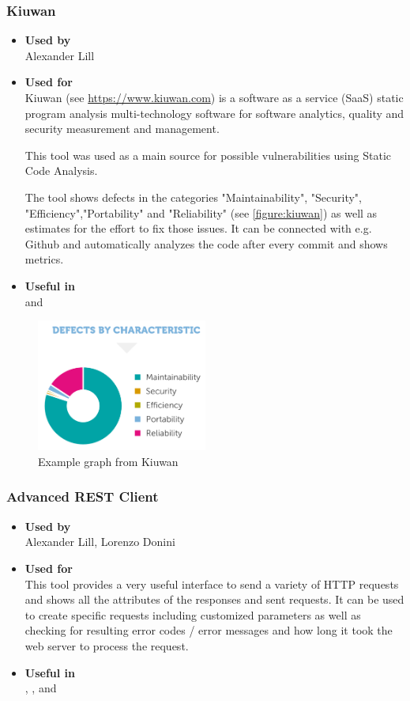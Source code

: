 \subsubsection*{Kiuwan}
\begin{itemize}
	\item \textbf{Used by}\\ Alexander Lill
	\item \textbf{Used for}\\
	Kiuwan (see \url{https://www.kiuwan.com}) is a software as a service (SaaS) static program analysis multi-technology software for software analytics, quality and security measurement and management.
	
	This tool was used as a main source for possible vulnerabilities using Static Code Analysis.
	
	The tool shows defects in the categories "Maintainability", "Security", "Efficiency","Portability" and "Reliability" (see \autoref{figure:kiuwan}) as well as estimates for the effort to fix those issues. It can be connected with e.g. Github and automatically analyzes the code after every commit and shows metrics.
	\item \textbf{Useful in}\\  and 
\end{itemize}

\begin{figure}[h!tbp]
	\centering
	\includegraphics[width=0.5\textwidth]{figures/kiuwanResults}
	\caption{Example graph from Kiuwan}
	\label{figure:kiuwan}
\end{figure}

\subsubsection*{Advanced REST Client}
\begin{itemize}
	\item \textbf{Used by}\\ Alexander Lill, Lorenzo Donini
	\item \textbf{Used for}\\
	This tool provides a very useful interface to send a variety of HTTP requests and shows all the attributes of the responses and sent requests. It can be used to create specific requests including customized parameters as well as checking for resulting error codes / error messages and how long it took the web server to process the request.
	\item \textbf{Useful in}\\ , ,  and 
\end{itemize}

